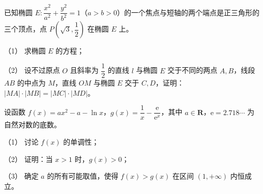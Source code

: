 \begin{question}
已知椭圆 \(E:\dfrac{x^{2}}{a^{2}}+\dfrac{y^{2}}{b^{2}}=1\)（\(a>b>0\)）的一个焦点与短轴的两个端点是正三角形的三个顶点，点 \(P\left(\sqrt{3},\dfrac{1}{2}\right)\) 在椭圆 \(E\) 上。

（1） 求椭圆 \(E\) 的方程；

（2） 设不过原点 \(O\) 且斜率为 \(\dfrac{1}{2}\) 的直线 \(l\) 与椭圆 \(E\) 交于不同的两点 \(A,B\)，线段 \(AB\) 的中点为 \(M\)，直线 \(OM\) 与椭圆 \(E\) 交于 \(C,D\)，证明：\(|MA|\cdot|MB|=|MC|\cdot|MD|\)。

\end{question}
\begin{question}
设函数 \(f(x)=ax^{2}-a-\ln x\)，\(g(x)=\dfrac{1}{x}-\dfrac{\mathrm{e}}{\mathrm{e}^{x}}\)，其中 \(a\in\mathbf{R}\)，\(\mathrm{e}=2.718\cdots\) 为自然对数的底数。

（1） 讨论 \(f(x)\) 的单调性；

（2） 证明：当 \(x>1\) 时，\(g(x)>0\)；

（3） 确定 \(a\) 的所有可能取值，使得 \(f(x)>g(x)\) 在区间 \((1,+\infty)\) 内恒成立。

\end{question}
